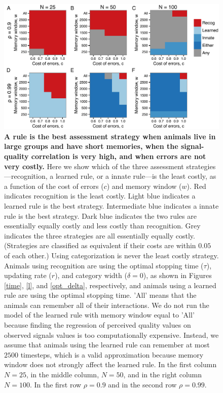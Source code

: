 \begin{figure}
\includegraphics[width=6.85in]{figures/best_type_of_learning.pdf}
\caption{\sffamily\small\textbf{A rule is the best assessment strategy when animals live in large groups and have short memories, when the signal-quality correlation is very high, and when errors are not very costly.} Here we show which of the three assessment strategies---recognition, a learned rule, or a innate rule---is the least costly, as a function of the cost of errors ($c$) and memory window ($w$). Red indicates recognition is the least costly. Light blue indicates a learned rule is the best strategy. Intermediate blue indicates a innate rule is the best strategy. Dark blue indicates the two rules are essentially equally costly and less costly than recognition. Grey indicates the three strategies are all essentially equally costly. (Strategies are classified as equivalent if their costs are within $0.05$ of each other.) Using categorization is never the least costly strategy. Animals using recognition are using the optimal stopping time ($\tau$), updating rate ($r$), and category width ($\delta=0$), as shown in Figures \ref{time}, \ref{l}, and \ref{opt_delta}, respectively, and animals using a learned rule are using the optimal stopping time. 'All' means that the animals can remember all of their interactions. We do not run the model of the learned rule with memory window equal to 'All' because finding the regression of perceived quality values on observed signals values is too computationally expensive. Instead, we assume that animals using the learned rule can remember at most $2500$ timesteps, which is a valid approximation because memory window does not strongly affect the learned rule. In the first column $N=25$, in the middle column, $N=50$, and in the right column $N=100$. In the first row $\rho=0.9$ and in the second row $\rho=0.99$.}
\label{best}
\end{figure}

